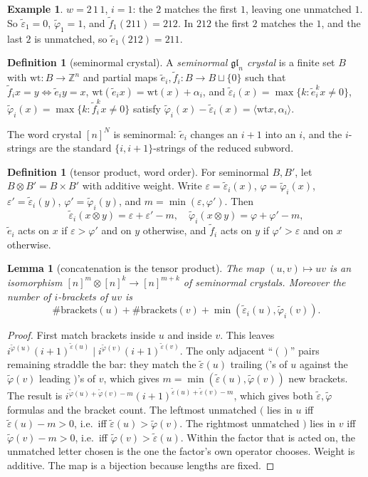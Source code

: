 \documentclass[11pt]{amsart}
\newtheorem{lemma}[theorem]{Lemma}
\theoremstyle{definition}
\newtheorem{definition}[theorem]{Definition}
\newtheorem{example}[theorem]{Example}
\theoremstyle{remark}
\newcommand{\te}{\tilde e}
\newcommand{\tf}{\tilde f}
\newcommand{\teps}{\tilde\varepsilon}
\newcommand{\tphi}{\tilde\varphi}
\newcommand{\wt}{\mathrm{wt}}
\begin{document}
\begin{example}
$w=2\,1\,1$, $i=1$: the $2$ matches the first $1$, leaving one unmatched $1$. So $\teps_1=0$, $\tphi_1=1$, and $\tf_1(211)=212$. In $212$ the first $2$ matches the $1$, and the last $2$ is unmatched, so $\te_1(212)=211$.
\end{example}

\begin{definition}[seminormal crystal]
A \emph{seminormal $\mathfrak{gl}_n$ crystal} is a finite set $B$ with $\wt:B\to\mathbb Z^n$ and partial maps $\te_i,\tf_i:B\to B\sqcup\{0\}$ such that $\tf_i x=y\iff \te_i y=x$, $\wt(\te_i x)=\wt(x)+\alpha_i$, and
$\teps_i(x)=\max\{k:\te_i^kx\neq0\}$, $\tphi_i(x)=\max\{k:\tf_i^kx\ne0\}$ satisfy $\tphi_i(x)-\teps_i(x)=\langle\wt x,\alpha_i\rangle$.
\end{definition}

The word crystal $[n]^N$ is seminormal: $\te_i$ changes an $i+1$ into an $i$, and the $i$-strings are the standard $\{i,i+1\}$-strings of the reduced subword.

\begin{definition}[tensor product, word order]\label{def:tensor}
For seminormal $B,B'$, let $B\otimes B'=B\times B'$ with additive weight. Write $\varepsilon=\teps_i(x)$, $\varphi=\tphi_i(x)$, $\varepsilon'=\teps_i(y)$, $\varphi'=\tphi_i(y)$, and $m=\min(\varepsilon,\varphi')$. Then
\[\teps_i(x\otimes y)=\varepsilon+\varepsilon'-m,\quad \tphi_i(x\otimes y)=\varphi+\varphi'-m,\]
$\te_i$ acts on $x$ if $\varepsilon>\varphi'$ and on $y$ otherwise, and $\tf_i$ acts on $y$ if $\varphi'>\varepsilon$ and on $x$ otherwise.
\end{definition}

\begin{lemma}[concatenation is the tensor product]\label{lem:concat}
The map $(u,v)\mapsto uv$ is an isomorphism $[n]^m\otimes[n]^k\to[n]^{m+k}$ of seminormal crystals. Moreover the number of $i$-brackets of $uv$ is
\[\#\text{brackets}(u)+\#\text{brackets}(v)+\min(\teps_i(u),\tphi_i(v)).\]
\end{lemma}
\begin{proof}
First match brackets inside $u$ and inside $v$. This leaves $i^{\tphi(u)}(i+1)^{\teps(u)}\;\big|\;i^{\tphi(v)}(i+1)^{\teps(v)}$. The only adjacent ``$()$'' pairs remaining straddle the bar: they match the $\teps(u)$ trailing $($'s of $u$ against the $\tphi(v)$ leading $)$'s of $v$, which gives $m=\min(\teps(u),\tphi(v))$ new brackets. The result is $i^{\tphi(u)+\tphi(v)-m}(i+1)^{\teps(u)+\teps(v)-m}$, which gives both $\teps,\tphi$ formulas and the bracket count. The leftmost unmatched $($ lies in $u$ iff $\teps(u)-m>0$, i.e.\ iff $\teps(u)>\tphi(v)$. The rightmost unmatched $)$ lies in $v$ iff $\tphi(v)-m>0$, i.e.\ iff $\tphi(v)>\teps(u)$. Within the factor that is acted on, the unmatched letter chosen is the one the factor's own operator chooses. Weight is additive. The map is a bijection because lengths are fixed.
\end{proof}
\end{document}
